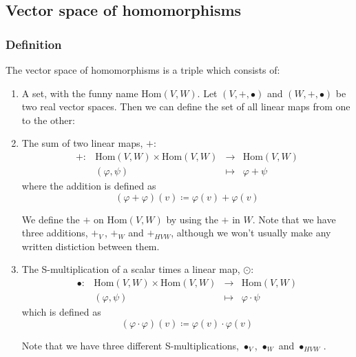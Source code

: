 \subsection{Vector space of homomorphisms}
\subsubsection{Definition}
The vector space of homomorphisms is a triple which consists of: 
\begin{enumerate}
\item A set, with the funny name $\text{Hom}(V,W)$.
  Let $(V,+,\vysmblkcircle)$ and $(W,+,\vysmblkcircle)$
  be two real\footnotemark{} vector spaces. Then we can define the set of all linear maps from one
  to the other:
  \begin{center}
  \end{center}  
  
\item The sum of two linear maps, $+$:
  \[
    \begin{array}{cccc}
      + : & \text{Hom}(V,W) \times \text{Hom}(V,W) &\longrightarrow & \text{Hom}(V,W)\\
               &    (\varphi,\psi)  & \mapsto & \varphi + \psi
    \end{array}
  \]
  where the addition is defined as
  \[
    (\varphi + \varphi)(v) \coloneq \varphi(v) + \varphi(v)
  \]
  
  We define the $+$ on $\text{Hom}(V,W)$ by using the $+$ in $W$.
  Note that we have three additions, $+_{\scriptscriptstyle V}$\,,
  $+_{\scriptscriptstyle W}$ and $+_{\scriptscriptstyle HVW}$, although we won't usually make any
  written distiction between them.

\item The S-multiplication of a scalar times a linear map, $\scriptstyle\odot$:
  \[
    \begin{array}{cccc}
      \vysmblkcircle : & \text{Hom}(V,W) \times \text{Hom}(V,W) &\longrightarrow & \text{Hom}(V,W)\\
               &    (\varphi,\psi)  & \mapsto & \varphi \cdot \psi
    \end{array}
  \]
  which is defined as
  \[
    (\varphi \cdot \varphi)(v) \coloneq \varphi(v) \cdot \varphi(v)
  \]
  
  Note that we have three different S-multiplications,
  $\vysmblkcircle_{\scriptscriptstyle V}$, $\vysmblkcircle_{\scriptscriptstyle W}$ and
  $\vysmblkcircle_{\scriptscriptstyle HVW}$\,.
\end{enumerate}

